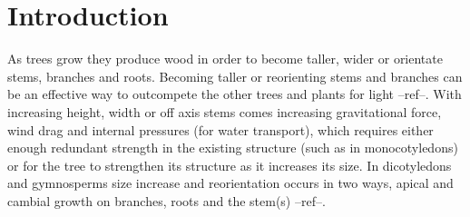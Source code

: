 \section{Introduction}
As trees grow they produce wood in order to become taller, wider or orientate
stems, branches and roots. Becoming taller or reorienting stems and branches can
be an effective way to outcompete the other trees and plants for light --ref--.
With increasing height, width or off axis stems comes increasing gravitational
force, wind drag and internal pressures (for water transport), which requires
either enough redundant strength in the existing structure (such as in
monocotyledons) or for the tree to strengthen its structure as it increases its
size. In dicotyledons and gymnosperms size increase and reorientation occurs in
two ways, apical and cambial growth on branches, roots and the stem(s) --ref--.